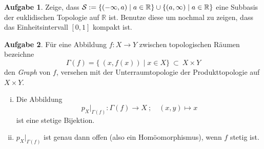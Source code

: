 \documentclass{article}
\theoremstyle{definition}
\newtheorem{aufgabe}{Aufgabe}
\theoremstyle{remark}
\newcommand{\R}{\mathbb{R}}
\begin{document}
\begin{aufgabe}
	Zeige, dass $\cS:=\{(-\infty,a)\mid a\in\R\}\cup\{(a,\infty)\mid a\in\R\}$ eine Subbasis der euklidischen Topologie auf $\R$ ist. Benutze diese um nochmal zu zeigen, dass das Einheitsintervall $[0,1]$ kompakt ist.
\end{aufgabe}
\begin{aufgabe}
	Für eine Abbildung $f\colon X \rightarrow Y$ zwischen topologischen
	Räumen bezeichne
	\[\Gamma(f) = \{ \ (x,f(x)) \mid x \in X\} \ \subset\ X \times Y\]
	den {\it Graph} von $f$, versehen mit der Unterraumtopologie der
	Produkttopologie auf $X \times Y$.
	\begin{enumerate}[i)]
		\item Die Abbildung \[p_X|_{\Gamma(f)}\colon\Gamma(f) \rightarrow X\ ;\quad (x,y) \mapsto x \]
		ist eine stetige Bijektion.
		\item $p_X|_{\Gamma(f)}$ ist genau dann offen (also ein Homöomorphismus), wenn $f$ stetig ist.
	\end{enumerate}
\end{aufgabe}
\end{document}
